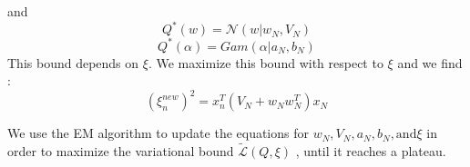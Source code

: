 and 
$$Q ^ *(w)=\mathcal{N}(w | w_N, V_N)$$ 
$$Q^ *(\alpha)=Gam(\alpha | a_N, b_N)$$
This bound depends on $\xi$. We maximize this bound with respect to $\xi$ and we find : 
\begin{equation}
(\xi_n^{new})^2=x_n^T (V_N +w_Nw_N ^T) x_N
\end{equation}


We use the EM algorithm to update the equations for $ w_N , V_N, a_N, b_N, \text{and}  \xi $ in order to maximize the variational bound $\mathcal{\tilde{L}}(Q, \xi)$ , until it reaches a plateau. 


